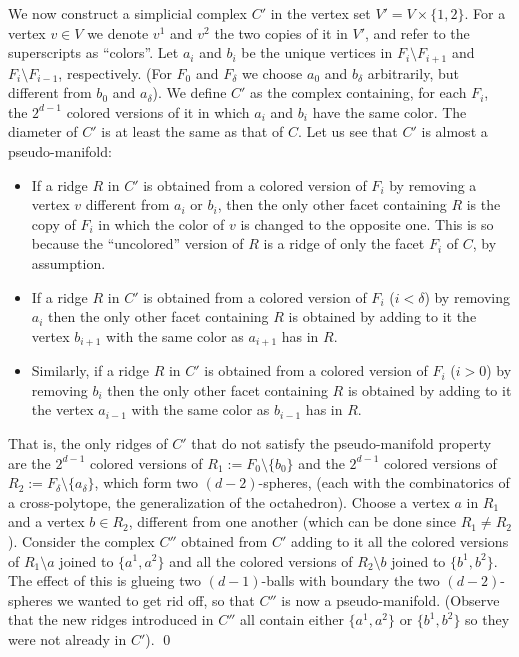 \documentclass[12pt,a4paper]{article}
\theoremstyle{plain}
\theoremstyle{definition}
\begin{document}
We now construct a simplicial complex $C'$ in the vertex set $V'=V\times\{1,2\}$. For a vertex $v\in V$ we denote $v^1$ and $v^2$ the two copies of it in $V'$, and refer to the superscripts as ``colors''.
Let $a_i$ and $b_i$ be the unique vertices in $F_i\setminus F_{i+1}$ and $F_i\setminus F_{i-1}$, respectively. (For $F_0$ and $F_{\delta}$ we choose $a_0$ and $b_\delta$ arbitrarily, but different from $b_0$ and $a_\delta$). We define $C'$ as the complex containing, for each $F_i$, the $2^{d-1}$ colored versions of it in which $a_i$ and $b_i$ have the same color. The diameter of $C'$ is at least the same as that of $C$. Let us see that $C'$ is almost a pseudo-manifold:
\begin{itemize}
\item If a ridge $R$ in $C'$ is obtained from a colored version of $F_i$ by removing a vertex $v$ different from $a_i$ or $b_i$, then the only other facet containing $R$ is the copy of $F_i$ in which the color of $v$ is changed to the opposite one. This is so because the ``uncolored'' version of $R$ is a ridge of only the facet $F_i$ of $C$, by assumption.

\item If a ridge $R$ in $C'$ is obtained from a colored version of $F_i$ ($i<\delta$) by removing $a_i$ then the only other facet containing $R$ is obtained by adding to it the vertex $b_{i+1}$ with the same color as $a_{i+1}$ has in $R$.

\item Similarly, if a ridge $R$ in $C'$ is obtained from a colored version of $F_i$ ($i>0$) by removing $b_i$ then the only other facet containing $R$ is obtained by adding to it the vertex $a_{i-1}$ with the same color as $b_{i-1}$ has in $R$.
\end{itemize}

That is, the only ridges of $C'$ that do not satisfy the pseudo-manifold property are the $2^{d-1}$ colored versions of $R_1:=F_0\setminus \{b_0\}$ and the $2^{d-1}$ colored versions of $R_2:=F_\delta\setminus \{a_\delta\}$, which form two $(d-2)$-spheres, (each with the combinatorics of a cross-polytope, the generalization of the octahedron). Choose a vertex $a$ in $R_1$ and a vertex $b\in R_2$, different from one another (which can be done since $R_1\ne R_2$). Consider the complex $C''$ obtained from $C'$ adding to it all the colored versions of $R_1\setminus a$ joined to $\{a^1,a^2\}$ and all the colored versions of $R_2\setminus b$ joined to $\{b^1,b^2\}$. The effect of this is glueing two $(d-1)$-balls with boundary the two $(d-2)$-spheres we wanted to get rid off, so that $C''$ is now a pseudo-manifold. (Observe that the new ridges introduced in $C''$ all contain either $\{a^1,a^2\}$ or $\{b^1,b^2\}$ so they were not already in $C'$).
\qed
\end{document}
